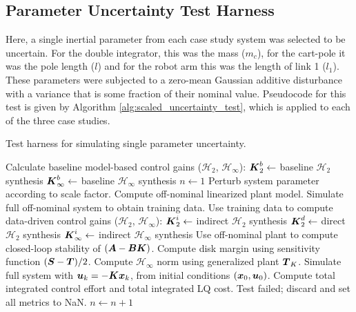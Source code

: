 \newpage
\subsection{Parameter Uncertainty Test Harness}
Here, a single inertial parameter from each case study system was selected to be uncertain.  For the double integrator, this was the mass ($m_{c}$), for the cart-pole it was the pole length ($l$) and for the robot arm this was the length of link 1 ($l_{1}$).  These parameters were subjected to a zero-mean Gaussian additive disturbance with a variance that is some fraction of their nominal value.  Pseudocode for this test is given by Algorithm \ref{alg:scaled_uncertainty_test}, which is applied to each of the three case studies.

\begin{algorithm}
\caption{Test harness for simulating single parameter uncertainty.}
\label{alg:scaled_uncertainty_test}
\begin{algorithmic}
	\State Calculate baseline model-based control gains ($\mathcal{H}_{2}$, $\mathcal{H}_{\infty}$):
	\State \hspace{10pt} $\vb*{K}_{2}^{b} \gets $ baseline $\mathcal{H}_{2}$ synthesis
	\State \hspace{10pt} $\vb*{K}_{\infty}^{b} \gets $ baseline $\mathcal{H}_{\infty}$ synthesis
		\State $n \gets 1$
			\State Perturb system parameter according to scale factor.
			\State Compute off-nominal linearized plant model.
			\State Simulate full off-nominal system to obtain training data.
			\State Use training data to compute data-driven control gains ($\mathcal{H}_{2}$, $\mathcal{H}_{\infty}$):
			\State \hspace{10pt} $\vb*{K}_{2}^{i} \gets $ indirect $\mathcal{H}_{2}$ synthesis
			\State \hspace{10pt} $\vb*{K}_{2}^{d} \gets $ direct $\mathcal{H}_{2}$ synthesis
			\State \hspace{10pt} $\vb*{K}_{\infty}^{i} \gets $ indirect $\mathcal{H}_{\infty}$ synthesis
				\State Use off-nominal plant to compute closed-loop stability of $(\vb*{A} - \vb*{B}\vb*{K})$.
					\State Compute disk margin using sensitivity function $(\vb*{S} - \vb*{T})/2$.
					\State Compute $\mathcal{H}_{\infty}$ norm using generalized plant $\vb*{T}_{K}$.
					\State Simulate full system with $\vb*{u}_{k} = -\vb*{K}\vb*{x}_{k}$, from initial conditions $(\vb*{x}_{0},\vb*{u}_{0})$.
					\State Compute total integrated control effort and total integrated LQ cost.
				\Else
					\State Test failed; discard and set all metrics to NaN.
				\EndIf
			\EndFor
		\State $n \gets n + 1$
		\EndWhile
	\EndFor
\end{algorithmic}
\end{algorithm}

